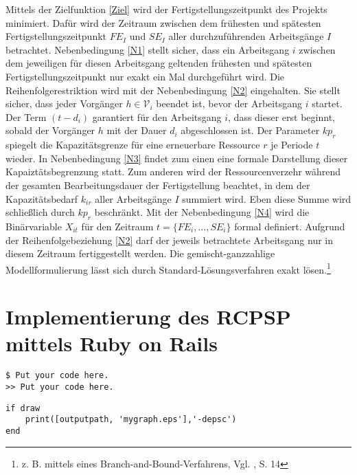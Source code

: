 \documentclass[a4paper,12pt,parskip,bibtotoc,liststotoc]{article}
\begin{document}
Mittels der Zielfunktion \eqref{Ziel} wird der Fertigstellungszeitpunkt des Projekts minimiert. Dafür wird der Zeitraum zwischen dem frühesten und spätesten Fertigstellungszeitpunkt $FE_{I}$ und $SE_{I}$ aller durchzuführenden Arbeitsgänge $I$ betrachtet. Nebenbedingung \eqref{N1} stellt sicher, dass ein Arbeitsgang $i$ zwischen dem jeweiligen für diesen Arbeitsgang geltenden frühesten und spätesten Fertigstellungszeitpunkt nur exakt ein Mal durchgeführt wird. Die Reihenfolgerestriktion wird mit der Nebenbedingung \eqref{N2} eingehalten. Sie stellt sicher, dass jeder Vorgänger $h \in \mathcal{V}_{i}$ beendet ist, bevor der Arbeitsgang $i$ startet. Der Term $(t - d_{i})$ garantiert für den Arbeitsgang $i$, dass dieser erst beginnt, sobald der Vorgänger $h$ mit der Dauer $d_{i}$ abgeschlossen ist.
Der Parameter $kp_{r}$ spiegelt die Kapazitätsgrenze für eine erneuerbare Ressource $r$ je Periode $t$ wieder. In Nebenbedingung \eqref{N3} findet zum einen eine formale Darstellung dieser Kapaiztätsbegrenzung statt. Zum anderen wird der Ressourcenverzehr während der gesamten Bearbeitungsdauer der Fertigstellung beachtet, in dem der Kapazitätsbedarf $k_{ir}$ aller Arbeitsgänge $I$ summiert wird. Eben diese Summe wird schließlich durch $kp_{r}$ beschränkt. %
Mit der Nebenbedingung \eqref{N4} wird die Binärvariable $X_{it}$ für den Zeitraum $t = \{FE_{i},...,SE_{i}\}$ formal definiert. Aufgrund der Reihenfolgebeziehung \eqref{N2} darf der jeweils betrachtete Arbeitsgang nur in diesem Zeitraum fertiggestellt werden.
Die gemischt-ganzzahlige Modellformulierung lässt sich durch Standard-Lösungsverfahren exakt lösen.\footnote{z. B. mittels eines Branch-and-Bound-Verfahrens, Vgl. \cite{kellenbrink2014einfuhrung}, S. 14}


\section{Implementierung des RCPSP mittels Ruby on Rails} \label{Haupt}
\begin{lstlisting}[style=Befehl]
$ Put your code here.
>> Put your code here.
\end{lstlisting}

\begin{lstlisting}[caption=Beispielcode, style=Listing]
if draw
    print([outputpath, 'mygraph.eps'],'-depsc')
end
\end{lstlisting}


%
\end{document}
